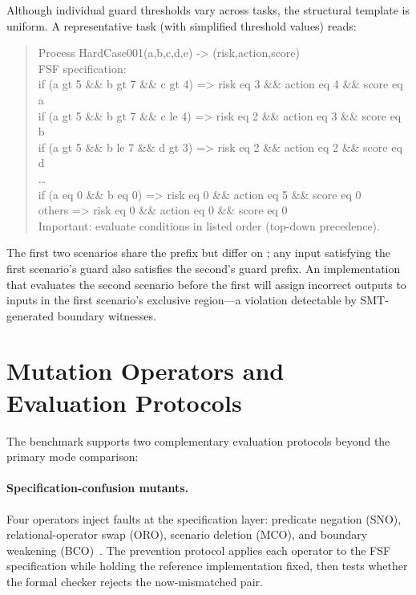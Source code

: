Although individual guard thresholds vary across tasks, the structural template
is uniform.  A representative task (with simplified threshold values) reads:

\begin{quote}\small\ttfamily
Process HardCase001(a,b,c,d,e) -> (risk,action,score)\\[2pt]
FSF specification:\\
if (a gt 5 \&\& b gt 7 \&\& c gt 4) => risk eq 3 \&\& action eq 4 \&\& score eq a\\
if (a gt 5 \&\& b gt 7 \&\& c le 4) => risk eq 2 \&\& action eq 3 \&\& score eq b\\
if (a gt 5 \&\& b le 7 \&\& d gt 3) => risk eq 2 \&\& action eq 2 \&\& score eq d\\
\ldots\\
if (a eq 0 \&\& b eq 0) => risk eq 0 \&\& action eq 5 \&\& score eq 0\\
others => risk eq 0 \&\& action eq 0 \&\& score eq 0\\[2pt]
Important: evaluate conditions in listed order (top-down precedence).
\end{quote}

The first two scenarios share the prefix  but
differ on ; any input satisfying the first scenario's guard also
satisfies the second's guard prefix.  An implementation that evaluates the
second scenario before the first will assign incorrect outputs to inputs in
the first scenario's exclusive region---a violation detectable by
SMT-generated boundary witnesses.

\section{Mutation Operators and Evaluation Protocols}
\label{sec:bench:mutation}

The benchmark supports two complementary evaluation protocols beyond the
primary mode comparison:

\paragraph{Specification-confusion mutants.}
Four operators inject faults at the specification layer: predicate negation
(SNO), relational-operator swap (ORO), scenario deletion (MCO), and boundary
weakening (BCO)~\citep{demillo1978mutation,offutt1992mutation}.  The prevention protocol applies each operator to the FSF
specification while holding the reference implementation fixed, then tests
whether the formal checker rejects the now-mismatched pair.


